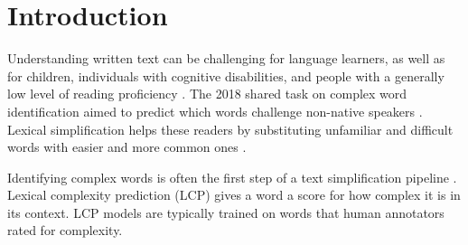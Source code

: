\section{Introduction}
\label{sec:intro}

Understanding written text can be challenging for language learners, as well as for children,
individuals with cognitive disabilities, and people with a generally low level of reading
proficiency \citep{saggion-etal-2024-lexical}. The 2018 shared task on complex word identification
aimed to predict which words challenge non-native speakers \citep{yimam-etal-2018-report}. Lexical
simplification helps these readers by substituting unfamiliar and difficult words with easier and
more common ones \citep{saggion-etal-2024-lexical}.

Identifying complex words is often the first step of a text simplification pipeline
\citep{qiu-etal-2024-complex}. Lexical complexity prediction (LCP) gives a word a score for how
complex it is in its context. LCP models are typically trained on words that human annotators rated
for complexity.

